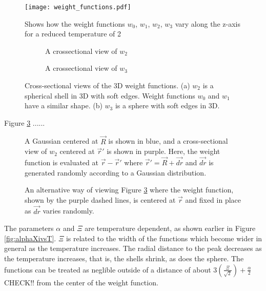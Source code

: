 \documentclass[double,12pt]{beavtex}
\begin{document}
 \begin{figure}[h!]
    \centering
    \texttt{[image: weight\_functions.pdf]}
    \caption{Shows how the weight functions $w_0$, $w_1$, $w_2$, $w_3$ vary along the 
    z-axis for a reduced temperature of 2}
    \label{fig:weight_functions}
  \end{figure}  


 \begin{figure}[h!]
    \centering
    \begin{subfigure}[b]{0.4\linewidth}
      \caption{A crossectional view of $w_2$}
    \end{subfigure} 
    \begin{subfigure}[b]{0.4\linewidth}
      \caption{A crossectional view of $w_3$}
    \end{subfigure} 
    \caption{Cross-sectional views of the 3D weight functions. (a) $w_2$ is a 
    spherical shell in 3D with soft edges. Weight functions $w_0$ and $w_1$ 
    have a similar shape. (b) $w_3$ is a sphere with soft edges in 3D.}
    \label{fig:W0andW3}
    \end{figure} 


Figure \ref{fig:GaussandW2_actual} ......

 \begin{figure}[h!]
    \centering
    \caption{A Gaussian centered at $\vec{R}$ is shown in blue, and a cross-sectional 
    view of $w_2$ centered at $\vec{r}'$ is shown in purple. Here, the weight function 
    is evaluated at $\vec{r}-\vec{r}'$ where $\vec{r}'=\vec{R}+\vec{dr}$ and $\vec{dr}$ 
    is generated randomly according to a Gaussian distribution.} 
  \label{fig:GaussandW2_actual}
  \end{figure} 

 \begin{figure}[h!]
    \centering
    \caption{An alternative way of viewing Figure \ref{fig:GaussandW2_actual} where 
    the weight function, shown by the purple dashed lines, is centered at $\vec{r}$  
    and fixed in place as $\vec{dr}$ varies randomly.} 
  \label{fig:GaussandW2_thinkas}
  \end{figure} 


The parameters $\alpha$ and $\Xi$ are temperature dependent, as shown earlier in 
Figure \ref{fig:alphaXivsT}. $\Xi$ is related to the width of the functions which 
become wider in general as the temperature increases. The radial distance to the 
peak decreases as the temperature increases, that is, the shells shrink, as does 
the sphere. The functions can be treated as neglible outside of a distance of 
about $3(\frac{\Xi}{\sqrt{2}}) + \frac{\alpha}{2}$ CHECK!! from the center of 
the weight function.
\end{document}
